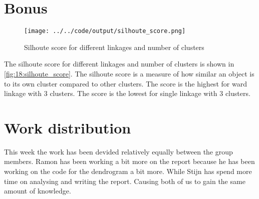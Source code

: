 \documentclass[twoside, a4paper, fleqn, reqno]{article}
\begin{document}
\section{Bonus}

\begin{figure}[H]
	\centering
	\texttt{[image: ../../code/output/silhoute\_score.png]}
	\caption{Silhoute score for different linkages and number of clusters} 
	\label{fig:18:silhoute_score}
\end{figure}

The silhoute score for different linkages and number of clusters is shown in \autoref{fig:18:silhoute_score}.
The silhoute score is a measure of how similar an object is to its own cluster compared to other clusters.
The score is the highest for ward linkage with 3 clusters.
The score is the lowest for single linkage with 3 clusters.

\section{Work distribution}

This week the work has been devided relatively equally between the group members.
Ramon has been working a bit more on the report because he has been working on the code for the dendrogram a bit more.
While Stijn has spend more time on analysing and writing the report. Causing both of us to gain the same amount of knowledge.
\end{document}
